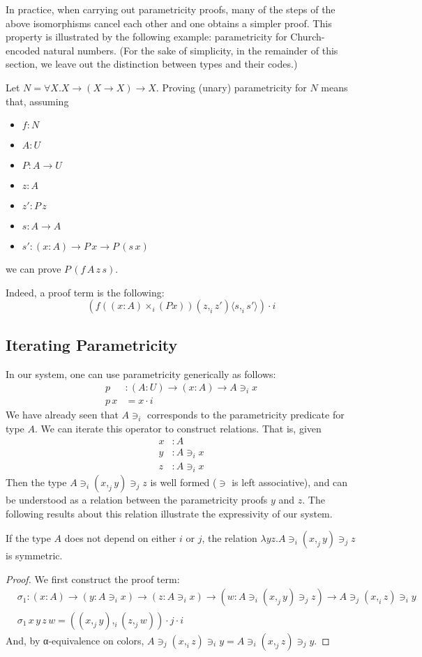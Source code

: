 \documentclass[english]{PaperTools/latex/lipics}
\newcommand\CP[3]{(#2,_{#1} #3)}
\newcommand\CTimes[2]{(#2) ×_{#1}}
\newcommand\param[1]{\!\cdot\!#1}
\newcommand\op[1]{∋_{#1}}
\newcommand\fp[3]{⟨#2 ,_{#1} #3⟩}
\begin{document}
In practice, when carrying out parametricity proofs, many of the steps
of the above isomorphisms cancel each other and one obtains a simpler
proof. This property is illustrated by the following example:
parametricity for Church-encoded natural numbers.
(For the sake of simplicity, in the remainder of this section, we leave out the
distinction between types and their codes.)
\begin{example}
Let $N = ∀X. X → (X → X) → X$.
Proving (unary) parametricity for $N$ means that, assuming
\begin{itemize}
\item $f : N$
\item $A : U$
\item $P : A → U$
\item $z : A$
\item $z' : P\, z$
\item $s : A → A$
\item $s' : (x:A) → P\, x → P\, (s\, x)$
\end{itemize}
we can prove $P\, (f\, A\, z\, s)$.

Indeed, a proof term is the following:
%
\[
(f (\CTimes i {x:A} (P x)) \CP i z {z'} \fp i s {s'}) \param i
\]
\end{example}

\subsection{Iterating Parametricity}
In our system, one can use parametricity generically as follows:
\begin{align*}
p &: (A:U) → (x:A) → A \op i x\\
p\, x &= x\param i
\end{align*}
We have already seen that $A \op i $ corresponds to the parametricity
predicate for type $A$. We can iterate this operator to construct
relations. That is, given
\begin{align*}
  x & :A \\
  y & : A \op i x\\
  z & : A \op i x
\end{align*}
Then the type $A \op i \CP j x y \op j z$ is well formed ($∋$ is left
associative), and can be understood as a relation
between the parametricity proofs $y$ and $z$. The following results about this relation illustrate the expressivity of our system.
\begin{theorem}
If the type $A$ does not depend on either $i$ or $j$, the relation $λy z. A \op i \CP j x y \op j z$ is symmetric.
\end{theorem}
\begin{proof}
  We first construct the proof term:
  \begin{align*}
    &\sigma_1 : (x:A) → (y : A \op i x) → (z : A \op i x) → (w : A \op i \CP j x y \op j z) → A \op j \CP i x z \op i y \\
    &\sigma_1\, x\, y\, z\, w = \CP i {\CP j x y}{\CP j z w} \param j \param i
  \end{align*}
  And, by α-equivalence on colors, $A \op j \CP i x z \op i y = A \op i \CP j x z \op j y$.
\end{proof}
\end{document}
